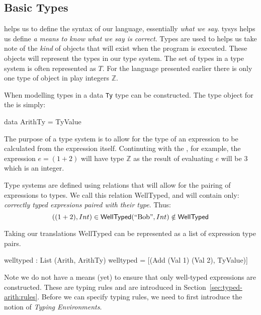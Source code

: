 \subsection{Basic Types}
\label{sec:typed-arith:types}

 helps us to define the syntax of our language, essentially \emph{what we say}.
\gls{tysys} helps us define \emph{a means to know what we say is correct}.
Types are used to helps us take note of the \emph{kind} of objects that will exist when the program is executed.
These objects will represent the types in our type system.
The set of types in a type system is often represented as $T$.
For the language presented earlier there is only one type of object in play integers $\mathbb{Z}$.

\begin{bnf}
\end{bnf}

\noindent
When modelling types in \idris{} a data \texttt{Ty} type can be constructed.
The type object for the \allang{} is simply:

\begin{code}
data ArithTy = TyValue
\end{code}

\noindent
The purpose of a type system is to allow for the type of an expression to be calculated from the expression itself.
Continuting with the \allang{}, for example, the expression $e=(1 + 2)$ will have type $\mathbb{Z}$ as the result of evaluating $e$ will be $3$ which is an integer.

Type systems are defined using relations that will allow for the pairing of expressions to types.
We call this relation \textsf{WellTyped}, and will contain only: \emph{correctly typed expresions paired with their type}.
Thus:
\[
((1+2), Int)\in\mathsf{WellTyped}\\
(\text{``Bob''},Int)\notin\mathsf{WellTyped}
\]

\noindent
Taking our \idris{} translations \textsf{WellTyped} can be represented as a list of expression type pairs.

\begin{code}
welltyped : List (Arith, ArithTy)
welltyped = [(Add (Val 1) (Val 2), TyValue)]
\end{code}

\noindent
Note we do not have a means (yet) to ensure that only well-typed expressions are constructed.
These are typing rules and are introduced in Section~\ref{sec:typed-arith:rules}.
Before we can specify typing rules, we need to first introduce the notion of \emph{Typing Environments}.

